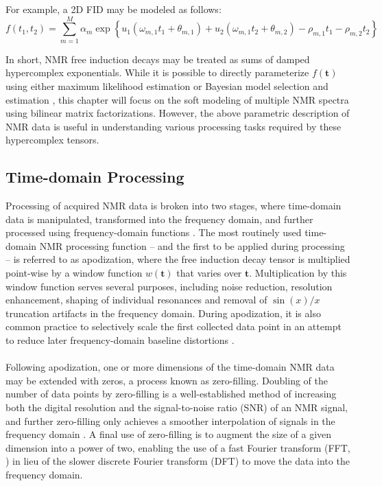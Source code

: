\begin{doublespace}
For example, a 2D FID may be modeled as follows:
\begin{equation}
f(t_1, t_2) = \sum_{m=1}^M \alpha_m \exp\left\{
  u_1 (\omega_{m,1} t_1 + \theta_{m,1}) +
  u_2 (\omega_{m,1} t_2 + \theta_{m,2}) -
  \rho_{m,1} t_1 - \rho_{m,2} t_2
  \right\}
\end{equation}

In short, NMR free induction decays may be treated as sums of damped
hypercomplex exponentials. While it is possible to directly parameterize
$f(\mathbf{t})$ using either maximum likelihood estimation
\cite{chylla:jbnmr1995,chylla:jbnmr1998,chylla:anchem2011} or Bayesian
model selection and estimation
\cite{bretthorst:jmr1990a,
      bretthorst:jmr1990b,
      bretthorst:jmr1990c,
      chylla:jbnmr1993}, this chapter will focus on the soft modeling of
multiple NMR spectra using bilinear matrix factorizations. However, the above
parametric description of NMR data is useful in understanding various
processing tasks required by these hypercomplex tensors.
\end{doublespace}

\subsection{Time-domain Processing}

\begin{doublespace}
Processing of acquired NMR data is broken into two stages, where time-domain
data is manipulated, transformed into the frequency domain, and further
processed using frequency-domain functions \cite{hoch1996}.
The most routinely used time-domain NMR processing function -- and the first
to be applied during processing -- is referred to as apodization, where the
free induction decay tensor is multiplied point-wise by a window function
$w(\mathbf{t})$ that varies over $\mathbf{t}$. Multiplication by this window
function serves several purposes, including noise reduction, resolution
enhancement, shaping of individual resonances and removal of $\sin(x)/x$
truncation artifacts in the frequency domain. During apodization, it is also
common practice to selectively scale the first collected data point in an
attempt to reduce later frequency-domain baseline distortions
\cite{stoch:jmr2005,ebel:jmr2006}.
\\\\
Following apodization, one or more dimensions of the time-domain NMR data may
be extended with zeros, a process known as zero-filling. Doubling of the number
of data points by zero-filling is a well-established method of increasing both
the digital resolution and the signal-to-noise ratio (SNR) of an NMR signal,
and further zero-filling only achieves a smoother interpolation of signals in
the frequency domain \cite{ebel:jmr2006}. A final use of zero-filling is to
augment the size of a given dimension into a power of two, enabling the use of
a fast Fourier transform (FFT, \cite{cooley:mcomp1965}) in lieu of the slower
discrete Fourier transform (DFT) to move the data into the frequency domain.
\end{doublespace}

